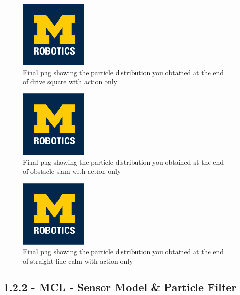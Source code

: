 \documentclass[journal,onecolumn]{IEEEtran}
\begin{document}
\begin{figure}[H]
\centering
\includegraphics[width=0.3\textwidth]{Media/template-robotics.jpg}
\caption{Final png showing the particle distribution you obtained at the end of drive square with action only}
\end{figure}

\begin{figure}[H]
\centering
\includegraphics[width=0.3\textwidth]{Media/template-robotics.jpg}
\caption{Final png showing the particle distribution you obtained at the end of obstacle slam with action only}
\end{figure}

\begin{figure}[H]
\centering
\includegraphics[width=0.3\textwidth]{Media/template-robotics.jpg}
\caption{Final png showing the particle distribution you obtained at the end of straight line calm with action only}
\end{figure}

\subsection*{1.2.2 - MCL - Sensor Model \& Particle Filter} 
\end{document}
